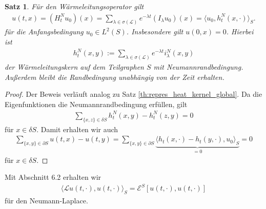 \documentclass[headsepline,11pt]{scrbook}
\newtheorem{thm}[lem]{Satz}
\theoremstyle{definition}
\begin{document}
\begin{thm}\label{th:repres_heat_kernel_neumann}
	F\"ur den W\"armeleitungsoperator gilt
	\begin{align}\label{eq:heat_kernel_def_neumann}
	u(t,x ) = (H_t^N u_0)(x) = 
	\sum \limits_{\lambda \in \sigma(\mathcal{L})} e^{- \lambda t } (I_\lambda u_0) (x) 
	=
	\langle u_0, h_t^N(x,\cdot) \rangle_S.
	\end{align}
	f\"ur die Anfangsbedingung $ u_0 \in L^2(S) $.
	Insbesondere gilt $ u(0,x ) = 0 $.
	Hierbei ist
	\begin{align}
	h_t^N(x,y) :=
	\sum \limits_{\lambda \in \sigma(\mathcal{L})}
	e^{- \lambda t} i_\lambda^N(x,y)
%	
	\end{align}
	der W\"armeleitungskern auf dem Teilgraphen $ S $ mit Neumannrandbedingung.
	Au\ss{}erdem bleibt die Randbedingung unabh\"angig von der Zeit erhalten.
\end{thm}

\begin{proof}
	Der Beweis verl\"auft analog zu Satz \ref{th:repres_heat_kernel_global}.
	Da die Eigenfunktionen die Neumannrandbedingung erf\"ullen, gilt 
	\begin{align*}
	\sum \limits_{\{x,z \} \in \delta S} h_t^N(x,y) - h_t^N(z,y) = 0
	\end{align*}
	f\"ur $ x \in \delta S$.
	Damit erhalten wir auch
	\begin{align*}
	\sum \limits_{\{x,y \} \in \partial S} u(t,x) - u(t,y)
	=
	\sum \limits_{\{ x,y\} \in \partial S} \underbrace{\langle h_t(x,\cdot) - h_t(y,\cdot), u_0 \rangle_S}_{=0} = 0
	\end{align*}  
	f\"ur $ x \in \delta S $.
\end{proof}
 
Mit Abschnitt 6.2 erhalten wir 
\begin{align}
\langle \mathcal{ L }u(t,\cdot) , u(t,\cdot ) \rangle_S
=
\mathcal{E}^S[u(t ,\cdot),u(t,\cdot)]
\end{align}
f\"ur den Neumann-Laplace.
\end{document}
